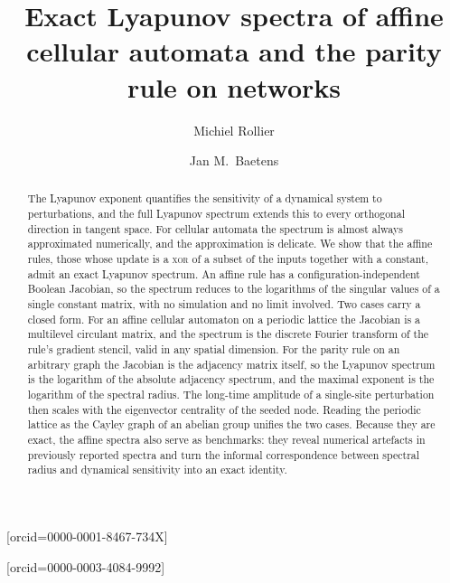 \documentclass[a4paper,fleqn]{cas-dc}
\begin{document}
\let\WriteBookmarks\relax


\title[mode=title]{Exact Lyapunov spectra of affine cellular automata and the parity rule on networks}

\author[ugent,usp]{Michiel Rollier}[orcid=0000-0001-8467-734X]
\cormark[1]

\author[ugent]{Jan M.~Baetens}[orcid=0000-0003-4084-9992]




\begin{abstract}
The Lyapunov exponent quantifies the sensitivity of a dynamical system to perturbations, and the full Lyapunov spectrum extends this to every orthogonal direction in tangent space. For cellular automata the spectrum is almost always approximated numerically, and the approximation is delicate. We show that the affine rules, those whose update is a \textsc{xor} of a subset of the inputs together with a constant, admit an exact Lyapunov spectrum. An affine rule has a configuration-independent Boolean Jacobian, so the spectrum reduces to the logarithms of the singular values of a single constant matrix, with no simulation and no limit involved. Two cases carry a closed form. For an affine cellular automaton on a periodic lattice the Jacobian is a multilevel circulant matrix, and the spectrum is the discrete Fourier transform of the rule's gradient stencil, valid in any spatial dimension. For the parity rule on an arbitrary graph the Jacobian is the adjacency matrix itself, so the Lyapunov spectrum is the logarithm of the absolute adjacency spectrum, and the maximal exponent is the logarithm of the spectral radius. The long-time amplitude of a single-site perturbation then scales with the eigenvector centrality of the seeded node. Reading the periodic lattice as the Cayley graph of an abelian group unifies the two cases. Because they are exact, the affine spectra also serve as benchmarks: they reveal numerical artefacts in previously reported spectra and turn the informal correspondence between spectral radius and dynamical sensitivity into an exact identity.
\end{abstract}
\end{document}

